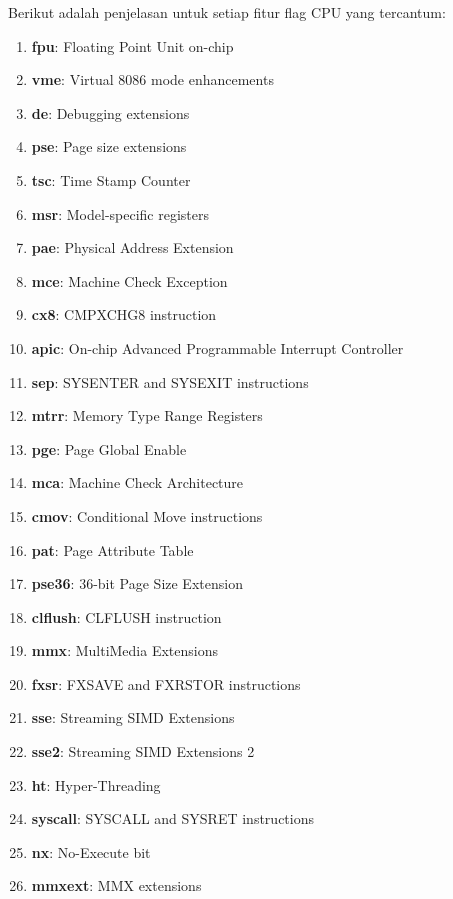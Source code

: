 Berikut adalah penjelasan untuk setiap fitur flag CPU yang tercantum:
\begin{multicols}{2}
    \begin{enumerate}
        \item \textbf{fpu}: Floating Point Unit on-chip
        \item \textbf{vme}: Virtual 8086 mode enhancements
        \item \textbf{de}: Debugging extensions
        \item \textbf{pse}: Page size extensions
        \item \textbf{tsc}: Time Stamp Counter
        \item \textbf{msr}: Model-specific registers
        \item \textbf{pae}: Physical Address Extension
        \item \textbf{mce}: Machine Check Exception
        \item \textbf{cx8}: CMPXCHG8 instruction
        \item \textbf{apic}: On-chip Advanced Programmable Interrupt Controller
        \item \textbf{sep}: SYSENTER and SYSEXIT instructions
        \item \textbf{mtrr}: Memory Type Range Registers
        \item \textbf{pge}: Page Global Enable
        \item \textbf{mca}: Machine Check Architecture
        \item \textbf{cmov}: Conditional Move instructions
        \item \textbf{pat}: Page Attribute Table
        \item \textbf{pse36}: 36-bit Page Size Extension
        \item \textbf{clflush}: CLFLUSH instruction
        \item \textbf{mmx}: MultiMedia Extensions
        \item \textbf{fxsr}: FXSAVE and FXRSTOR instructions
        \item \textbf{sse}: Streaming SIMD Extensions
        \item \textbf{sse2}: Streaming SIMD Extensions 2
        \item \textbf{ht}: Hyper-Threading
        \item \textbf{syscall}: SYSCALL and SYSRET instructions
        \item \textbf{nx}: No-Execute bit
        \item \textbf{mmxext}: MMX extensions

\end{enumerate}
\end{multicols}
